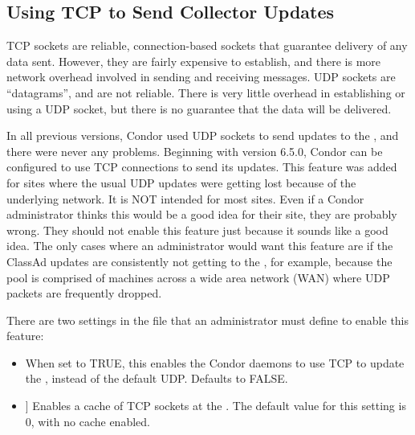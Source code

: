 \subsection{\label{sec:tcp-collector-update}
Using TCP to Send Collector Updates}


TCP sockets are reliable, connection-based sockets that guarantee
delivery of any data sent.
However, they are fairly expensive to establish, and there is more
network overhead involved in sending and receiving messages.
UDP sockets are ``datagrams'', and are not reliable.
There is very little overhead in establishing or using a UDP socket,
but there is no guarantee that the data will be delivered.

In all previous versions, Condor used UDP sockets to send updates to
the , and there were never any problems.
Beginning with version 6.5.0, Condor can be configured to use TCP
connections to send its updates.
This feature was added for sites where the usual UDP updates were
getting lost because of the underlying network.
It is NOT intended for most sites.
Even if a Condor administrator thinks this would be a good idea for
their site, they are probably wrong.
They should not enable this feature just because it sounds like a good
idea.
The only cases where an administrator would want this feature are if
the ClassAd updates are consistently not getting to the
, for example, because the pool is comprised of
machines across a wide area network (WAN) where UDP packets are
frequently dropped.

There are two settings in the  file that an
administrator must define to enable this feature:

\begin{itemize}

\item[\Macro{UPDATE\_COLLECTOR\_WITH\_TCP}]
  When set to TRUE, this enables the Condor daemons to use TCP to
  update the , instead of the default UDP.
  Defaults to FALSE.

\item {}] 
  Enables a cache of TCP sockets at the .
  The default value for this setting is 0, with no cache enabled.

\end{itemize}

